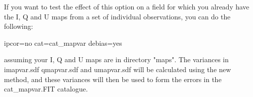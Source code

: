If you want to test the effect of this option on a field for which you
already have the I, Q and U maps from a set of individual
observations, you can do the following:

\begin{terminalv}
                   ipcor=no cat=cat_mapvar debias=yes
\end{terminalv}

assuming your I, Q and U maps are in directory "maps". The variances
in imapvar.sdf qmapvar.sdf and umapvar.sdf will be calculated using
the new method, and these variances will then be used to form the
errors in the cat_mapvar.FIT catalogue.



